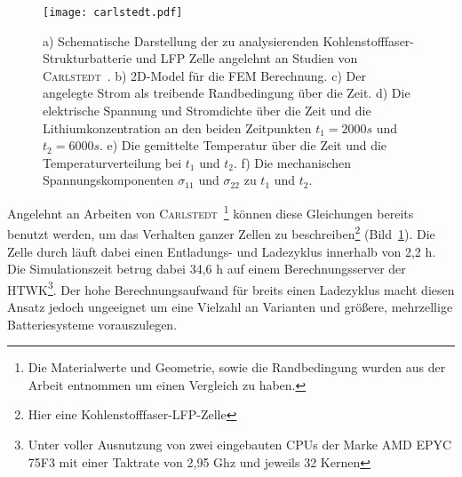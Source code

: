 \begin{figure}[!h]
        \center
		\texttt{[image: carlstedt.pdf]}
		\caption{\label{fig:carlstedt}a) Schematische Darstellung der zu analysierenden Kohlenstofffaser-Strukturbatterie und LFP Zelle angelehnt an Studien von \textsc{Carlstedt}~\cite{Carlstedt2022b}. b) 2D-Model für die FEM Berechnung. c) Der angelegte Strom als treibende Randbedingung über die Zeit. d) Die elektrische Spannung und Stromdichte über die Zeit und die Lithiumkonzentration an den beiden Zeitpunkten $t_1= 2000s$ und $t_2= 6000s$. e) Die gemittelte Temperatur über die Zeit und die Temperaturverteilung bei $t_1$ und $t_2$. f) Die mechanischen Spannungskomponenten $\sigma_{11}$ und $\sigma_{22}$ zu $t_1$ und $t_2$.}
\end{figure}

Angelehnt an Arbeiten von \textsc{Carlstedt}~\cite{Carlstedt2022b}\footnote{Die Materialwerte und Geometrie, sowie die Randbedingung wurden aus der Arbeit entnommen um einen Vergleich zu haben.} können diese Gleichungen bereits benutzt werden, um das Verhalten  ganzer Zellen zu beschreiben\footnote{Hier eine Kohlenstofffaser-LFP-Zelle} (Bild~\ref{fig:carlstedt}). Die Zelle durch läuft dabei einen Entladungs- und Ladezyklus innerhalb von 2,2 h. Die Simulationszeit betrug dabei 34,6 h auf einem Berechnungsserver der HTWK\footnote{Unter voller Ausnutzung von zwei eingebauten CPUs der Marke AMD EPYC 75F3 mit einer Taktrate von 2,95 Ghz und jeweils 32 Kernen}. Der hohe Berechnungsaufwand für breits einen Ladezyklus macht diesen Ansatz jedoch ungeeignet um eine Vielzahl an Varianten und größere, mehrzellige Batteriesysteme vorauszulegen.

